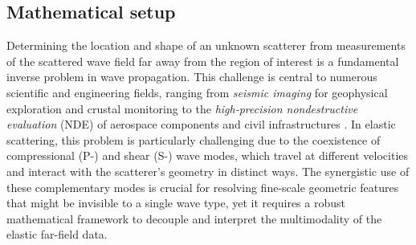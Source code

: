 \documentclass[11pt,reqno,twoside]{amsart}
\theoremstyle{definition}
\theoremstyle{remark}
\numberwithin{equation}{section}
\begin{document}
\subsection{Mathematical setup}

Determining the location and shape of an unknown scatterer from measurements of the scattered wave field far away from the region of interest is a fundamental inverse problem in wave propagation. This challenge is central to numerous scientific and engineering fields, ranging from \emph{seismic imaging} for geophysical exploration and crustal monitoring to the \emph{high-precision nondestructive evaluation} (NDE) of aerospace components and civil infrastructures \cite{OB04,ABGKLW15}. In elastic scattering, this problem is particularly challenging due to the coexistence of compressional (P-) and shear (S-) wave modes, which travel at different velocities and interact with the scatterer's geometry in distinct ways.  The synergistic use of these complementary modes is crucial for resolving fine-scale geometric features that might be invisible to a single wave type, yet it requires a robust mathematical framework to decouple and interpret the multimodality of the elastic far-field data. 
\end{document}
